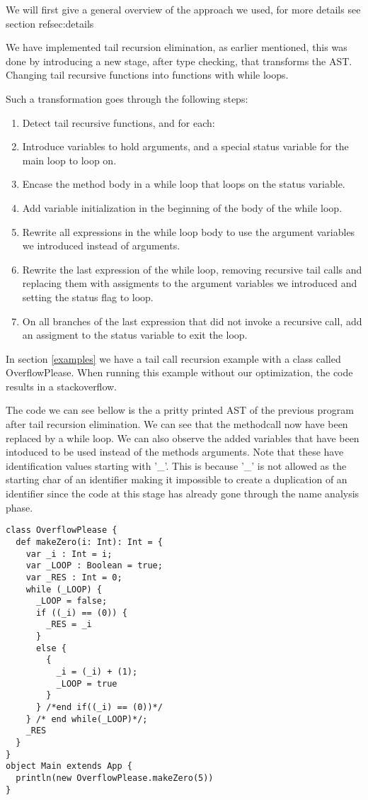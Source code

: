 \label{implementation} We will first give a general overview of the approach we used, for more details see section ref{sec:details}

We have implemented tail recursion elimination, as earlier mentioned, this was done by introducing a new stage, after type checking, that transforms the AST. Changing tail recursive functions into functions with while loops.

Such a transformation goes through the following steps:

\begin{enumerate}
    \item Detect tail recursive functions, and for each:
    \item Introduce variables to hold arguments, and a special status variable for the main loop to loop on.
    \item Encase the method body in a while loop that loops on the status variable.
    \item Add variable initialization in the beginning of the body of the while loop.
    \item Rewrite all expressions in the while loop body to use the argument variables we introduced instead of arguments. 
    \item Rewrite the last expression of the while loop, removing recursive tail calls and replacing them with assigments to the argument variables we introduced and setting the status flag to loop.
    \item On all branches of the last expression that did not invoke a recursive call, add an assigment to the status variable to exit the loop.
\end{enumerate}

In section \ref{examples} we have a tail call recursion example with a class called OverflowPlease. When running this example without our optimization, the code results in a stackoverflow.

The code we can see bellow is the a pritty printed AST of the previous program after tail recursion elimination. We can see that the methodcall now have been replaced by a while loop. We can also observe the added variables that have been intoduced to be used instead of the methods arguments. Note that these have identification values starting with '\_'. This is because '\_' is not allowed as the starting char of an identifier making it impossible to create a duplication of an identifier since the code at this stage has already gone through the name analysis phase. 
\begin{lstlisting}
class OverflowPlease {
  def makeZero(i: Int): Int = {
    var _i : Int = i;
    var _LOOP : Boolean = true;
    var _RES : Int = 0;
    while (_LOOP) {
      _LOOP = false;
      if ((_i) == (0)) {
        _RES = _i
      }
      else {
        {
          _i = (_i) + (1);
          _LOOP = true
        }
      } /*end if((_i) == (0))*/
    } /* end while(_LOOP)*/;
    _RES
  }
}
object Main extends App {
  println(new OverflowPlease.makeZero(5)) 
}
\end{lstlisting}



